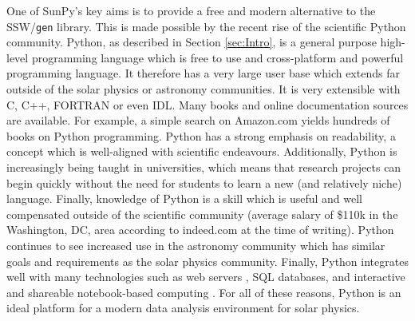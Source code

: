 One of SunPy's key aims is to provide a free and modern alternative to the 
SSW/\texttt{gen} library. This is made possible by the recent rise of the 
scientific Python community. Python, as described in Section \ref{sec:Intro}, 
is a general purpose high-level programming language which is free to use and 
cross-platform and powerful programming language.
It therefore has a very large user base which extends far outside of the 
solar physics or astronomy communities. It is very extensible with C, C++, 
FORTRAN or even IDL. Many books and online documentation sources are available. For 
example, a simple search on Amazon.com yields hundreds of books on Python programming.
%
% 
Python has a strong emphasis on readability, a concept which is well-aligned with scientific endeavours.
Additionally, Python is increasingly being taught in universities, which means 
that research projects can begin quickly without the need for students to learn 
a new (and relatively niche) language. Finally, knowledge of Python is a skill 
which is useful and well compensated outside of the scientific community 
(average salary of \$110k in the Washington, DC, area according to indeed.com at 
the time of writing). Python continues to see increased use in the astronomy 
community \citep{greenfield2011} which has similar goals and requirements as 
the solar physics community. Finally, Python integrates well with many 
technologies such as web servers \citep{dolgert2008}, SQL databases, and 
interactive and shareable notebook-based computing \citep{perez2007}. For all 
of these reasons, Python is an ideal platform for a modern data analysis environment 
for solar physics.

